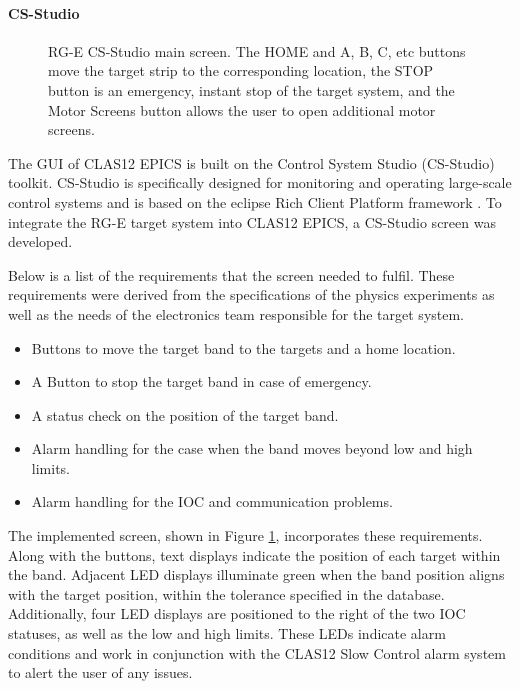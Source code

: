 \paragraph{CS-Studio}
    \begin{figure}[b!]
        \caption[RG-E CS-Studio main screen]
        {RG-E CS-Studio main screen.
        The HOME and A, B, C, etc buttons move the target strip to the corresponding location, the STOP button is an emergency, instant stop of the target system, and the Motor Screens button allows the user to open additional motor screens.}
        \label{fig::11.312::rge_motorx}
    \end{figure}

    The GUI of CLAS12 EPICS is built on the Control System Studio (CS-Studio) toolkit.
    CS-Studio is specifically designed for monitoring and operating large-scale control systems and is based on the eclipse Rich Client Platform framework \cite{kasemir2007}.
    To integrate the RG-E target system into CLAS12 EPICS, a CS-Studio screen was developed.

    Below is a list of the requirements that the screen needed to fulfil.
    These requirements were derived from the specifications of the physics experiments as well as the needs of the electronics team responsible for the target system.

    \begin{itemize}
        \item
            Buttons to move the target band to the targets and a home location.
        \item
            A Button to stop the target band in case of emergency.
        \item
            A status check on the position of the target band.
        \item
            Alarm handling for the case when the band moves beyond low and high limits.
        \item
            Alarm handling for the IOC and communication problems.
    \end{itemize}

    The implemented screen, shown in Figure \ref{fig::11.312::rge_motorx}, incorporates these requirements.
    Along with the buttons, text displays indicate the position of each target within the band.
    Adjacent LED displays illuminate green when the band position aligns with the target position, within the tolerance specified in the database.
    Additionally, four LED displays are positioned to the right of the two IOC statuses, as well as the low and high limits.
    These LEDs indicate alarm conditions and work in conjunction with the CLAS12 Slow Control alarm system to alert the user of any issues.

